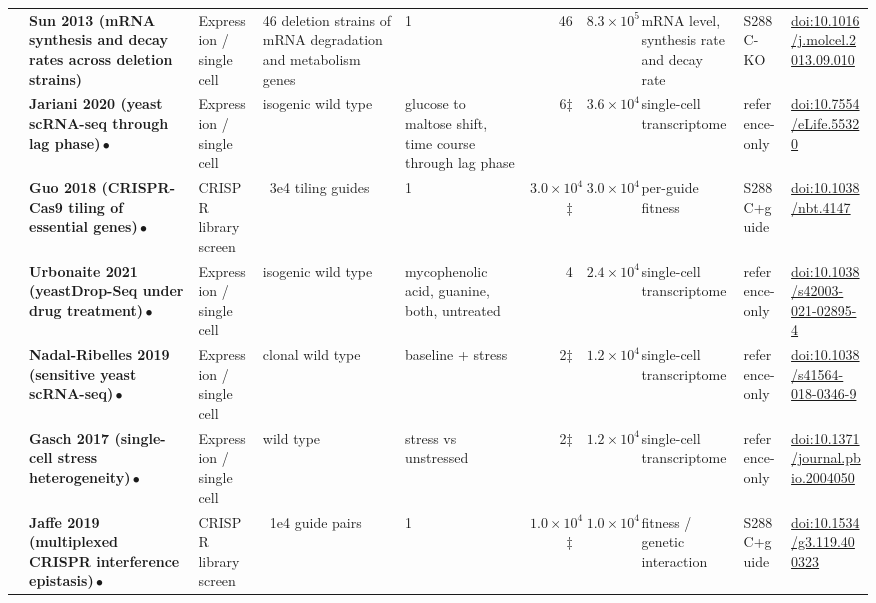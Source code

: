 \begin{landscape}
\begin{longtable}{@{}r@{\hspace{4pt}} L{42mm} L{21mm} L{26mm} L{20mm} r@{\hspace{5pt}} r@{\hspace{5pt}} L{30mm} L{23mm} L{34mm}@{}}
 & \textbf{Sun 2013 (mRNA synthesis and decay rates across deletion strains)} & Expression / single cell & 46 deletion strains of mRNA degradation and metabolism genes & 1 & 46 & $8.3\times 10^{5}$ & mRNA level, synthesis rate and decay rate & S288C-\allowbreak KO & \href{https://doi.org/10.1016/j.molcel.2013.09.010}{doi:10.1016/\allowbreak j.molcel.2013.09.010} \\
 & \textbf{Jariani 2020 (yeast scRNA-seq through lag phase)}\,$\bullet$ & Expression / single cell & isogenic wild type & glucose to maltose shift, time course through lag phase & 6$\ddagger$ & $3.6\times 10^{4}$ & single-cell transcriptome & reference-\allowbreak only & \href{https://doi.org/10.7554/eLife.55320}{doi:10.7554/\allowbreak eLife.55320} \\
 & \textbf{Guo 2018 (CRISPR-Cas9 tiling of essential genes)}\,$\bullet$ & CRISPR library screen & ~3e4 tiling guides & 1 & $3.0\times 10^{4}$$\ddagger$ & $3.0\times 10^{4}$ & per-guide fitness & S288C+\allowbreak guide & \href{https://doi.org/10.1038/nbt.4147}{doi:10.1038/\allowbreak nbt.4147} \\
 & \textbf{Urbonaite 2021 (yeastDrop-Seq under drug treatment)}\,$\bullet$ & Expression / single cell & isogenic wild type & mycophenolic acid, guanine, both, untreated & 4 & $2.4\times 10^{4}$ & single-cell transcriptome & reference-\allowbreak only & \href{https://doi.org/10.1038/s42003-021-02895-4}{doi:10.1038/\allowbreak s42003-021-02895-4} \\
 & \textbf{Nadal-Ribelles 2019 (sensitive yeast scRNA-seq)}\,$\bullet$ & Expression / single cell & clonal wild type & baseline + stress & 2$\ddagger$ & $1.2\times 10^{4}$ & single-cell transcriptome & reference-\allowbreak only & \href{https://doi.org/10.1038/s41564-018-0346-9}{doi:10.1038/\allowbreak s41564-018-0346-9} \\
 & \textbf{Gasch 2017 (single-cell stress heterogeneity)}\,$\bullet$ & Expression / single cell & wild type & stress vs unstressed & 2$\ddagger$ & $1.2\times 10^{4}$ & single-cell transcriptome & reference-\allowbreak only & \href{https://doi.org/10.1371/journal.pbio.2004050}{doi:10.1371/\allowbreak journal.pbio.2004050} \\
 & \textbf{Jaffe 2019 (multiplexed CRISPR interference epistasis)}\,$\bullet$ & CRISPR library screen & ~1e4 guide pairs & 1 & $1.0\times 10^{4}$$\ddagger$ & $1.0\times 10^{4}$ & fitness / genetic interaction & S288C+\allowbreak guide & \href{https://doi.org/10.1534/g3.119.400323}{doi:10.1534/\allowbreak g3.119.400323} \\

\end{longtable}
\end{landscape}
